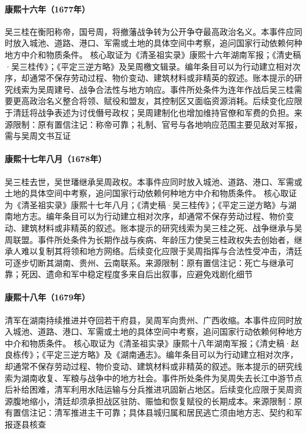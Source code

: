 \hypertarget{civic:EQ-1677-WU-ZHOU}{}\paragraph{康熙十六年（1677年）}吴三桂在衡阳称帝，国号周，将撤藩战争转为公开争夺最高政治名义。本事件应同时放入城池、道路、港口、军需或土地的具体空间中考察，追问国家行动依赖何种地方中介和物质条件。 核心取证为《清圣祖实录》康熙十六年湖南军报；《清史稿·吴三桂传》；《平定三逆方略》及吴周檄文辑录。编年条目可以为行动建立相对次序，却通常不保存劳动过程、物价变动、建筑材料或非精英的叙述。账本提示的研究线索为吴周建号、战争合法性与地方响应。事件所处条件为连年作战后吴三桂需要更高政治名义整合将领、赋役和盟友，其控制区又面临资源消耗。后续变化应限于清廷将战争表述为讨伐僭号政权；吴周建制化也增加维持官僚和军费的负担。来源限制：原有置信注记：称帝可靠；礼制、官号与各地响应范围主要见敌对军报，需与吴周文书互证
\hypertarget{civic:EQ-1678-WU-DEATH}{}\paragraph{康熙十七年八月（1678年）}吴三桂去世，吴世璠继承吴周政权。本事件应同时放入城池、道路、港口、军需或土地的具体空间中考察，追问国家行动依赖何种地方中介和物质条件。 核心取证为《清圣祖实录》康熙十七年八月；《清史稿·吴三桂传》；《平定三逆方略》与湖南地方志。编年条目可以为行动建立相对次序，却通常不保存劳动过程、物价变动、建筑材料或非精英的叙述。账本提示的研究线索为吴三桂之死、战争继承与吴周联盟。事件所处条件为长期作战与疾病、年龄压力使吴三桂政权失去创始者，继承人难以复制其将领和地方网络。后续变化应限于吴周指挥与合法性受冲击，清廷可逐步切断其湖南、贵州、云南联系。来源限制：原有置信注记：死亡与继承可靠；死因、遗命和军中稳定程度多来自后出叙事，应避免戏剧化细节
\hypertarget{civic:EQ-1679-HUNAN-RECOVERY}{}\paragraph{康熙十八年（1679年）}清军在湖南持续推进并夺回若干府县，吴周军向贵州、广西收缩。本事件应同时放入城池、道路、港口、军需或土地的具体空间中考察，追问国家行动依赖何种地方中介和物质条件。 核心取证为《清圣祖实录》康熙十八年湖南军报；《清史稿·赵良栋传》；《平定三逆方略》及《湖南通志》。编年条目可以为行动建立相对次序，却通常不保存劳动过程、物价变动、建筑材料或非精英的叙述。账本提示的研究线索为湖南收复、军粮与战争中的地方社会。事件所处条件为吴周失去长江中游节点后补给困难，清军利用水陆运输与分兵推进巩固新占地区。后续变化应限于吴周资源腹地缩小，清廷却须承担战区驻防、赈恤和恢复赋役的长期成本。来源限制：原有置信注记：清军推进主干可靠；具体县城归属和居民逃亡须由地方志、契约和军报逐县核查
